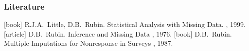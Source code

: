\documentclass[10pt]{beamer}\usepackage[]{graphicx}\usepackage[]{color}
\begin{document}
\begin{frame}[allowframebreaks]\frametitle{Literature}
  \begin{thebibliography}{10}
   [book]
  R.J.A.~Little, D.B.~Rubin.
    \newblock Statistical Analysis with Missing Data.
    , 1999.
  [article]
    D.B.~Rubin.
  \newblock Inference and Missing Data
  , 1976.
  [book]
    D.B.~Rubin.
  \newblock Multiple Imputations for Nonresponse in Surveys
  , 1987.  
  \end{thebibliography}
\end{frame} 


%  
%  
 
 
 
 

\end{document}
